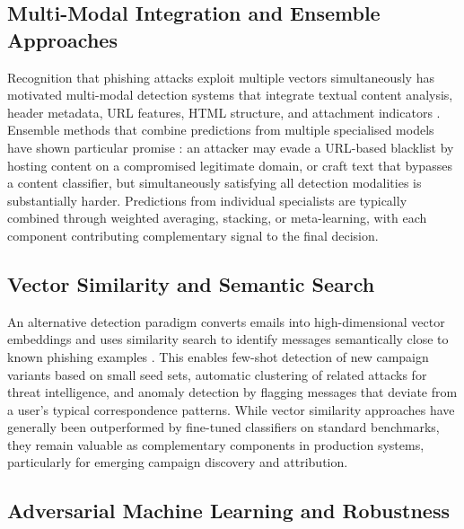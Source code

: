 \subsection{Multi-Modal Integration and Ensemble Approaches}

Recognition that phishing attacks exploit multiple vectors simultaneously has motivated multi-modal detection systems that integrate textual content analysis, header metadata, URL features, HTML structure, and attachment indicators \cite{PATRA2025110403,electronics12204261}. Ensemble methods that combine predictions from multiple specialised models have shown particular promise \cite{yazan2024ensemble}: an attacker may evade a URL-based blacklist by hosting content on a compromised legitimate domain, or craft text that bypasses a content classifier, but simultaneously satisfying all detection modalities is substantially harder. Predictions from individual specialists are typically combined through weighted averaging, stacking, or meta-learning, with each component contributing complementary signal to the final decision.

\subsection{Vector Similarity and Semantic Search}

An alternative detection paradigm converts emails into high-dimensional vector embeddings and uses similarity search to identify messages semantically close to known phishing examples \cite{mikolov2013distributed,PATRA2025110403}. This enables few-shot detection of new campaign variants based on small seed sets, automatic clustering of related attacks for threat intelligence, and anomaly detection by flagging messages that deviate from a user's typical correspondence patterns. While vector similarity approaches have generally been outperformed by fine-tuned classifiers on standard benchmarks, they remain valuable as complementary components in production systems, particularly for emerging campaign discovery and attribution.

\subsection{Adversarial Machine Learning and Robustness}

